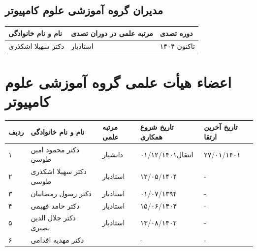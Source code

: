 \documentclass[
  letterpaper,
  DIV=11,
  numbers=noendperiod]{scrreprt}
\newcounter{none} %
\begin{document}
\subsection{مدیران گروه آموزشی علوم
کامپیوتر}\label{ux645ux62fux6ccux631ux627ux646-ux6afux631ux648ux647-ux622ux645ux648ux632ux634ux6cc-ux639ux644ux648ux645-ux6a9ux627ux645ux67eux6ccux648ux62aux631}

{\def\LTcaptype{none} %
\begin{longtable}[]{@{}lll@{}}
\toprule\noalign{}
نام و نام خانوادگی & مرتبه علمی در دوران تصدی & دوره تصدی \\
\midrule\noalign{}
\endhead
\bottomrule\noalign{}
\endlastfoot
دکتر سهیلا اشکذری & استادیار & ۱۴۰۴ تاکنون \\
\end{longtable}
}

\section{اعضاء هیأت علمی گروه آموزشی علوم
کامپیوتر}\label{ux627ux639ux636ux627ux621-ux647ux6ccux623ux62a-ux639ux644ux645ux6cc-ux6afux631ux648ux647-ux622ux645ux648ux632ux634ux6cc-ux639ux644ux648ux645-ux6a9ux627ux645ux67eux6ccux648ux62aux631}

{\def\LTcaptype{none} %
\begin{longtable}[]{@{}
  >{\raggedright\arraybackslash}p{}
  >{\raggedright\arraybackslash}p{}
  >{\raggedright\arraybackslash}p{}
  >{\raggedright\arraybackslash}p{}
  >{\raggedright\arraybackslash}p{}@{}}
\toprule\noalign{}
\begin{minipage}[b]{\linewidth}\raggedright
ردیف
\end{minipage} & \begin{minipage}[b]{\linewidth}\raggedright
نام و نام خانوادگی
\end{minipage} & \begin{minipage}[b]{\linewidth}\raggedright
مرتبه علمی
\end{minipage} & \begin{minipage}[b]{\linewidth}\raggedright
تاریخ شروع همکاری
\end{minipage} & \begin{minipage}[b]{\linewidth}\raggedright
تاریخ آخرین ارتقا
\end{minipage} \\
\midrule\noalign{}
\endhead
\bottomrule\noalign{}
\endlastfoot
۱ & دکتر محمود امین طوسی & دانشیار & انتقال۰۱/۱۲/۱۴۰۱ & ۲۷/۰۱/۱۴۰۱ \\
۲ & دکتر سهیلا اشکذری طوسی & استادیار & ۱۲/۰۵/۱۴۰۴ & - \\
۳ & دکتر رسول رمضانیان & استادیار & ۰۱/۰۷/۱۳۹۴ & - \\
۴ & دکتر حامد فهیمی & استادیار & ۱۵/۰۶/۱۴۰۴ & - \\
۵ & دکتر جلال الدین نصیری & استادیار & ۱۳/۰۸/۱۴۰۲ & - \\
۶ & دکتر مهدیه اقدامی & & - & - \\
\end{longtable}
}
\end{document}
